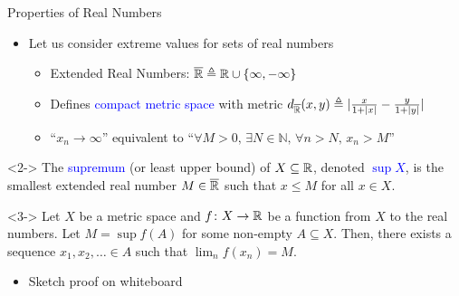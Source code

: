 \documentclass[10pt,english]{beamer}
\begin{document}
\begin{frame}{Properties of Real Numbers}

\begin{itemize}
\setlength\itemsep{3mm}
\item<1-> Let us consider extreme values for sets of real numbers \vspace{1mm}

\begin{itemize} 
  \setlength\itemsep{1.5mm}
  \item Extended Real Numbers: $\overline{\mathbb{R}} \triangleq \mathbb{R} \cup \{ \infty,-\infty\}$
  \item Defines \textcolor{blue}{compact metric space} with metric $d_{\overline{\mathbb{R}}} (x,y) \triangleq |\frac{x}{1+|x|} - \frac{y}{1+|y|}|$
  \item ``$x_n \to \infty$'' equivalent to ``$\forall M>0, \, \exists N\in \mathbb{N}, \, \forall n>N, \, x_n > M$''
\end{itemize}
\end{itemize}

\begin{definition}<2->
The \textcolor{blue}{supremum} (or least upper bound) of $X\subseteq \mathbb{R}$, denoted \textcolor{blue}{$\sup X$}, is the smallest extended real number $M \in \overline{\mathbb{R}}$ such that $x\leq M$ for all $x\in X$.
\end{definition}

\begin{lemma}<3->
Let $X$ be a metric space and $f \colon X\rightarrow \mathbb{R}$ be a function from $X$ to the real numbers.
Let $M = \sup f(A)$ for some non-empty $A \subseteq X$.
Then, there exists a sequence $x_1,x_2,\ldots \in A$ such that $\lim_n f(x_n) = M$.
\end{lemma}

\begin{itemize}
\item<4-> Sketch proof on whiteboard
\end{itemize}
  
\end{frame}
\end{document}

